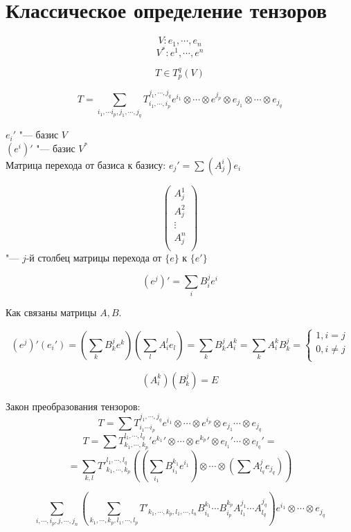 ﻿\section{Классическое определение тензоров}
$$V\colon e_1, \cdots, e_n$$
$$V^* \colon e^1, \cdots, e^n$$ 

$$T \in T_{p}^q(V)$$

$$T = \sum_{i_1, \cdots i_p, j_1, \cdots, j_q} T_{i_1, \cdots, i_p}^{j_1, \cdots, j_q} e^{i_1} \otimes \cdots \otimes e^{j_p} \otimes e_{j_1} \otimes \cdots \otimes e_{j_q}$$ 

$e_i'$ "--- базис $V$\\
$(e^i)'$ "--- базис $V^*$\\

Матрица перехода от базиса к базису: $e_j' = \sum(A_j^i)e_i$

$$\begin{pmatrix}
A^1_j\\
A^2_j\\
\vdots\\
A^n_j\\
\end{pmatrix}$$
"--- $j$-й столбец матрицы перехода от $\{e\}$ к $\{e'\}$

$$(e^j)' = \sum_{i}B^{j}_ie^i$$

Как связаны матрицы $A, B$.

$$(e^j)'(e_i') = (\sum_k B_{k}^je^k)(\sum_{l}A_{i}^le_l) = \sum_k B_{k}^j A_{i}^k = \sum_k A_i^kB_k^j = \left\{
\begin{aligned} 1, i = j\\ 
0, i \ne j\\
\end{aligned}
\right.$$

$$(A_i^k)(B_k^j) = E$$

Закон преобразования тензоров: 
$$T = \sum T_{i_1 \cdots i_p}^{j_1, \cdots, j_q}e^{i_1} \otimes \cdots \otimes e^{i_p} \otimes e_{j_1} \cdots \otimes e_{j_q}$$
$$T = \sum {T_{k_1, \cdots, k_p}^{l_1, \cdots, l_q}}'{e^{k_1}}' \otimes \cdots \otimes {e^{k_p}}' \otimes {e_{l_1}}' \cdots \otimes {e_{l_q}}' = $$
$$= \sum_{k,l}T'^{l_1, \cdots, l_q}_{k_1, \cdots, k_p}((\sum_{i_1}B_{i_1}^{k_1}e^{i_1}) \otimes \cdots \otimes (\sum A_{l_q}^{j}e_{j_q}))$$

$$\sum_{i, \cdots, i_p, j,\cdots, j_n} (\sum_{k_1,\cdots, k_p, l_1, \cdots, l_p}T'_{k_1, \cdots, k_p, l_1, \cdots, l_n}B_{i_1}^{k_1} \cdots B_{i_p}^{k_p}A_{l_1}^{j_1} \cdots A_{l_q}^{j_q})e^{i_1} \otimes \cdots \otimes e_{j_q}$$


